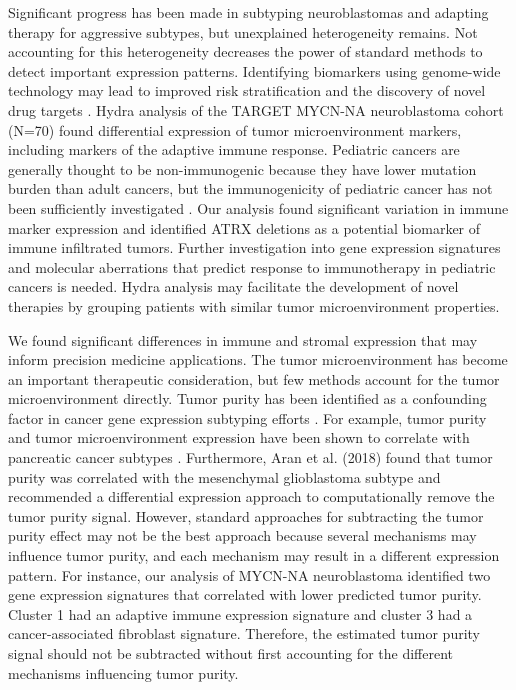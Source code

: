 \documentclass[10pt,letterpaper]{article}
\begin{document}
Significant progress has been made in subtyping neuroblastomas and adapting therapy for aggressive subtypes, but unexplained heterogeneity remains. Not accounting for this heterogeneity decreases the power of standard methods to detect important expression patterns. Identifying biomarkers using genome-wide technology may lead to improved risk stratification and the discovery of novel drug targets \cite{morgensternChallengeDefiningUltrahighrisk2019a}. Hydra analysis of the TARGET MYCN-NA neuroblastoma cohort (N=70) found differential expression of tumor microenvironment markers, including markers of the adaptive immune response. Pediatric cancers are generally thought to be non-immunogenic because they have lower mutation burden than adult cancers, but the immunogenicity of pediatric cancer has not been sufficiently investigated \cite{majzner2017harnessing}. Our analysis found significant variation in immune marker expression and identified ATRX deletions as a potential biomarker of immune infiltrated tumors. Further investigation into gene expression signatures and molecular aberrations that predict response to immunotherapy in pediatric cancers is needed. Hydra analysis may facilitate the development of novel therapies by grouping patients with similar tumor microenvironment properties.

We found significant differences in immune and stromal expression that may inform precision medicine applications. The tumor microenvironment has become an important therapeutic consideration, but few methods account for the tumor microenvironment directly. Tumor purity has been identified as a confounding factor in cancer gene expression subtyping efforts \cite{rheeImpactTumorPurity2018}. For example, tumor purity and tumor microenvironment expression have been shown to correlate with pancreatic cancer subtypes \cite{raphael2017integrated}. Furthermore, Aran et al. (2018) found that tumor purity was correlated with the mesenchymal glioblastoma subtype and recommended a differential expression approach to computationally remove the tumor purity signal. However, standard approaches for subtracting the tumor purity effect may not be the best approach because several mechanisms may influence tumor purity, and each mechanism may result in a different expression pattern. For instance, our analysis of MYCN-NA neuroblastoma identified two gene expression signatures that correlated with lower predicted tumor purity. Cluster 1 had an adaptive immune expression signature and cluster 3 had a cancer-associated fibroblast signature. Therefore, the estimated tumor purity signal should not be subtracted without first accounting for the different mechanisms influencing tumor purity.
\end{document}
